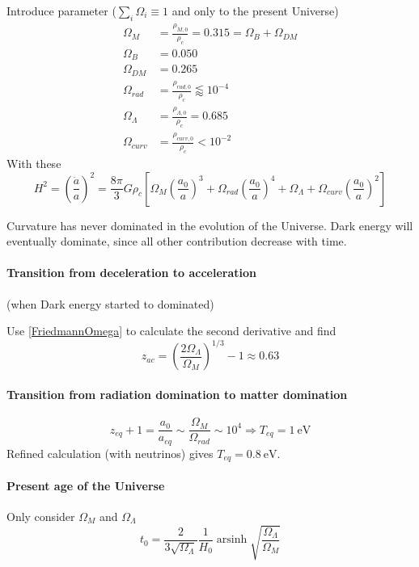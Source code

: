\documentclass[12pt, a4paper, DIV=15]{article}
\numberwithin{equation}{section}
\DeclareMathOperator{\arsinh}{arsinh}
\begin{document}
Introduce parameter ($\sum_i \Omega_i \equiv 1$ and only to the present Universe)
\begin{align}
   \Omega_M &= \frac{\rho_{M, 0}}{\rho_c}=0.315 =\Omega_B + \Omega_{DM} \\
   \Omega_B &= 0.050 \\
   \Omega_{DM} &= 0.265 \\
   \Omega_{rad} &= \frac{\rho_{rad,0}}{\rho_c} \lessapprox 10^{-4} \\
   \Omega_{\Lambda} &= \frac{\rho_{\Lambda,0}}{\rho_c} = 0.685\\
   \Omega_{curv} &= \frac{\rho_{curv,0}}{\rho_c} < 10^{-2}
\end{align}
With these
\begin{equation}
   H^2 = \left( \frac{\dot{a}}{a} \right)^2 = \frac{8\pi}{3} G \rho_c \left[ \Omega_M \left( \frac{a_0}{a} \right)^3 + \Omega_{rad} \left( \frac{a_0}{a} \right)^4 + \Omega_\Lambda + \Omega_{curv} \left( \frac{a_0}{a} \right)^2 \right] \label{FriedmannOmega}
\end{equation}

Curvature has never dominated in the evolution of the Universe. Dark energy will eventually dominate, since all other contribution decrease with time.

\paragraph{Transition from deceleration to acceleration} (when Dark energy started to dominated)

Use \eqref{FriedmannOmega} to calculate the second derivative and find
\begin{equation}
   z_{ac} = \left( \frac{2 \Omega_\Lambda}{\Omega_M} \right)^{1/3} - 1 \approx 0.63
\end{equation}

\paragraph{Transition from radiation domination to matter domination}
\begin{equation}
   z_{eq} + 1 = \frac{a_0}{a_{eq}} \sim \frac{\Omega_M}{\Omega_{rad}} \sim 10^4 \Rightarrow T_{eq} = \SI{1}{\eV}
\end{equation}
Refined calculation (with neutrinos) gives $T_{eq} = \SI{0.8}{\eV}$.

\paragraph{Present age of the Universe}
Only consider $\Omega_M$ and $\Omega_\Lambda$
\begin{equation}
   t_0 = \frac{2}{3\sqrt{\Omega_\Lambda}} \frac{1}{H_0} \arsinh \sqrt{\frac{\Omega_\Lambda}{\Omega_M}} 
\end{equation}
\end{document}
